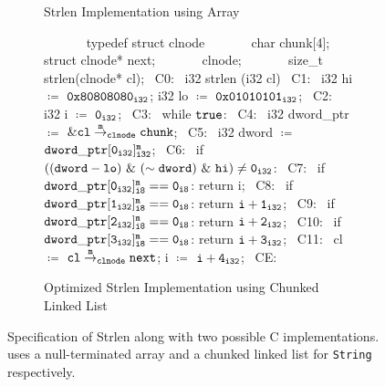 \begin{figure}[t]
\begin{subfigure}[b]{0.45\textwidth}
\begin{center}
\begin{allLangEnvFoot}
\end{allLangEnvFoot}
\end{center}
\caption{\label{fig:llStrlenCArrIR}Strlen Implementation using Array}
\end{subfigure}
\begin{subfigure}[b]{1\textwidth}
\begin{center}
\begin{allLangEnvFoot}
~{\tiny \textcolor{mygray}{\ \ \ \ }}~ typedef struct clnode {
~{\tiny \textcolor{mygray}{\ \ \ \ }}~ char chunk[4]; struct clnode* next;
~{\tiny \textcolor{mygray}{\ \ \ \ }}~ } clnode;
~{\tiny \textcolor{mygray}{\ \ \ \ }}~ size_t strlen(clnode* cl);
~{\tiny \textcolor{mygray}{C0\phantom{ }:}}~ i32 strlen (i32 cl) {
~{\tiny \textcolor{mygray}{C1\phantom{ }:}}~   i32 hi $\coloneqq$ $\mathrm{\tt 0x80808080_{i32}}$; i32 lo $\coloneqq$ $\mathrm{\tt 0x01010101_{i32}}$;
~{\tiny \textcolor{mygray}{C2\phantom{ }:}}~   i32 i  $\coloneqq$ $\mathrm{\tt 0_{i32}}$;
~{\tiny \textcolor{mygray}{C3\phantom{ }:}}~   while ${\tt true}$:
~{\tiny \textcolor{mygray}{C4\phantom{ }:}}~     i32 dword_ptr $\coloneqq$ ${\tt \& {\tt cl} \overset{m}{\rightarrow}_{{\tt clnode}} {\tt chunk}}$;
~{\tiny \textcolor{mygray}{C5\phantom{ }:}}~     i32 dword     $\coloneqq$ $\mathrm{\tt dword\_ptr[0_{i32}]^m_{i32}}$;
~{\tiny \textcolor{mygray}{C6\phantom{ }:}}~     if $\mathrm{\tt ((dword - lo)\ \&\ (\sim dword)\ \&\ hi) \neq 0_{i32}}$:
~{\tiny \textcolor{mygray}{C7\phantom{ }:}}~       if $\mathrm{\tt dword\_ptr[0_{i32}]^m_{i8} == 0_{i8}}$: return i;
~{\tiny \textcolor{mygray}{C8\phantom{ }:}}~       if $\mathrm{\tt dword\_ptr[1_{i32}]^m_{i8} == 0_{i8}}$: return $\mathrm{\tt i + 1_{i32}}$;
~{\tiny \textcolor{mygray}{C9\phantom{ }:}}~       if $\mathrm{\tt dword\_ptr[2_{i32}]^m_{i8} == 0_{i8}}$: return $\mathrm{\tt i + 2_{i32}}$;
~{\tiny \textcolor{mygray}{C10:}}~       if $\mathrm{\tt dword\_ptr[3_{i32}]^m_{i8} == 0_{i8}}$: return $\mathrm{\tt i + 3_{i32}}$;
~{\tiny \textcolor{mygray}{C11:}}~     cl $\coloneqq$ $\mathrm{\tt {\tt cl} \overset{m}{\rightarrow}_{{\tt clnode}} {\tt next}}$; i  $\coloneqq$ $\mathrm{\tt i + 4_{i32}}$;
~{\tiny \textcolor{mygray}{CE\phantom{ }:}}~ }
\end{allLangEnvFoot}
\end{center}
\caption{\label{fig:llStrlenCClistIR}Optimized Strlen Implementation using Chunked Linked List}
\end{subfigure}%
\caption{\label{fig:strlenSpecAndC}Specification of Strlen along with two possible C implementations.  uses a null-terminated array and a chunked linked list for {\tt String} respectively.}
\end{figure}
